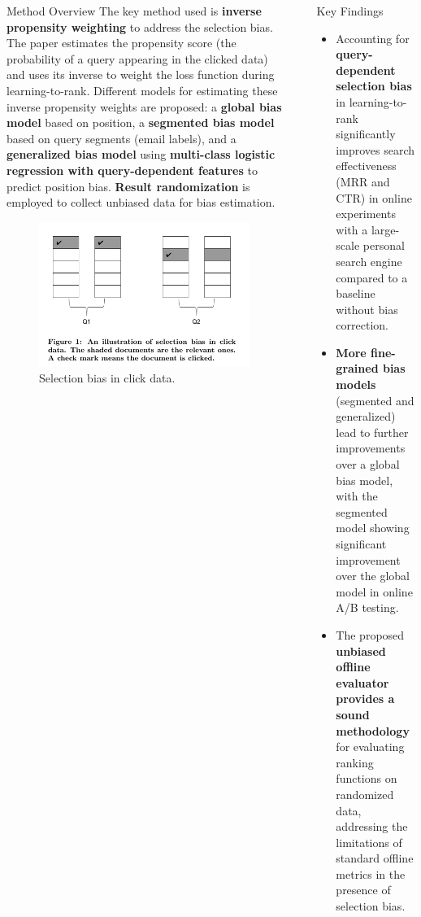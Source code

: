 \documentclass[final]{beamer}
\newlength{\sepwidth}
\newlength{\colwidth}
\newcommand{\separatorcolumn}{\begin{column}{\sepwidth}\end{column}}
\begin{document}
\begin{frame}[t]
\begin{columns}[t]
\begin{column}{\colwidth}
  \begin{block}{Method Overview}
	The key method used is \textbf{inverse propensity weighting} to address the selection bias. The paper estimates the propensity score (the probability of a query appearing in the clicked data) and uses its inverse to weight the loss function during learning-to-rank. Different models for estimating these inverse propensity weights are proposed: a \textbf{global bias model} based on position, a \textbf{segmented bias model} based on query segments (email labels), and a \textbf{generalized bias model} using \textbf{multi-class logistic regression with query-dependent features} to predict position bias. \textbf{Result randomization} is employed to collect unbiased data for bias estimation.
    \begin{figure}
      \centering
      \includegraphics[width=0.9\linewidth]{Screenshot from 2025-04-20 21-11-48.png}
      \caption{Selection bias in click
      	data.}
    \end{figure}
  \end{block}
\end{column}

\separatorcolumn

\begin{column}{\colwidth}

  \begin{block}{Key Findings}
    \begin{itemize}
      \item Accounting for \textbf{query-dependent selection bias} in learning-to-rank significantly improves search effectiveness (MRR and CTR) in online experiments with a large-scale personal search engine compared to a baseline without bias correction.
      \item \textbf{More fine-grained bias models} (segmented and generalized) lead to further improvements over a global bias model, with the segmented model showing significant improvement over the global model in online A/B testing.
      \item The proposed \textbf{unbiased offline evaluator provides a sound methodology} for evaluating ranking functions on randomized data, addressing the limitations of standard offline metrics in the presence of selection bias.
    \end{itemize}
  \end{block}


\end{column}
\end{columns}
\end{frame}
\end{document}
